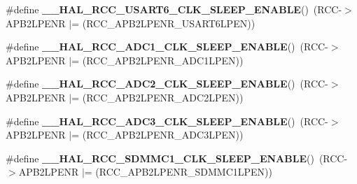 \begin{DoxyCompactItemize}
\item 
\mbox{\label{group___r_c_c_ex___peripheral___clock___sleep___enable___disable_ga47fc15bdbf943a0b7164d888f1811184}} 
\#define {\bfseries \+\_\+\+\_\+\+H\+A\+L\+\_\+\+R\+C\+C\+\_\+\+U\+S\+A\+R\+T6\+\_\+\+C\+L\+K\+\_\+\+S\+L\+E\+E\+P\+\_\+\+E\+N\+A\+B\+LE}()~(R\+CC-\/$>$A\+P\+B2\+L\+P\+E\+NR $\vert$= (R\+C\+C\+\_\+\+A\+P\+B2\+L\+P\+E\+N\+R\+\_\+\+U\+S\+A\+R\+T6\+L\+P\+EN))
\item 
\mbox{\label{group___r_c_c_ex___peripheral___clock___sleep___enable___disable_ga37931819af9a7b1a05385e0ae6c984b6}} 
\#define {\bfseries \+\_\+\+\_\+\+H\+A\+L\+\_\+\+R\+C\+C\+\_\+\+A\+D\+C1\+\_\+\+C\+L\+K\+\_\+\+S\+L\+E\+E\+P\+\_\+\+E\+N\+A\+B\+LE}()~(R\+CC-\/$>$A\+P\+B2\+L\+P\+E\+NR $\vert$= (R\+C\+C\+\_\+\+A\+P\+B2\+L\+P\+E\+N\+R\+\_\+\+A\+D\+C1\+L\+P\+EN))
\item 
\mbox{\label{group___r_c_c_ex___peripheral___clock___sleep___enable___disable_gafbb316ea37b8d92f7260c2bba7e47e3a}} 
\#define {\bfseries \+\_\+\+\_\+\+H\+A\+L\+\_\+\+R\+C\+C\+\_\+\+A\+D\+C2\+\_\+\+C\+L\+K\+\_\+\+S\+L\+E\+E\+P\+\_\+\+E\+N\+A\+B\+LE}()~(R\+CC-\/$>$A\+P\+B2\+L\+P\+E\+NR $\vert$= (R\+C\+C\+\_\+\+A\+P\+B2\+L\+P\+E\+N\+R\+\_\+\+A\+D\+C2\+L\+P\+EN))
\item 
\mbox{\label{group___r_c_c_ex___peripheral___clock___sleep___enable___disable_ga0063ad56c493dee710421f620332db05}} 
\#define {\bfseries \+\_\+\+\_\+\+H\+A\+L\+\_\+\+R\+C\+C\+\_\+\+A\+D\+C3\+\_\+\+C\+L\+K\+\_\+\+S\+L\+E\+E\+P\+\_\+\+E\+N\+A\+B\+LE}()~(R\+CC-\/$>$A\+P\+B2\+L\+P\+E\+NR $\vert$= (R\+C\+C\+\_\+\+A\+P\+B2\+L\+P\+E\+N\+R\+\_\+\+A\+D\+C3\+L\+P\+EN))
\item 
\mbox{\label{group___r_c_c_ex___peripheral___clock___sleep___enable___disable_ga864140e8659290a56eea3230bbb2ecc2}} 
\#define {\bfseries \+\_\+\+\_\+\+H\+A\+L\+\_\+\+R\+C\+C\+\_\+\+S\+D\+M\+M\+C1\+\_\+\+C\+L\+K\+\_\+\+S\+L\+E\+E\+P\+\_\+\+E\+N\+A\+B\+LE}()~(R\+CC-\/$>$A\+P\+B2\+L\+P\+E\+NR $\vert$= (R\+C\+C\+\_\+\+A\+P\+B2\+L\+P\+E\+N\+R\+\_\+\+S\+D\+M\+M\+C1\+L\+P\+EN))

\end{DoxyCompactItemize}
